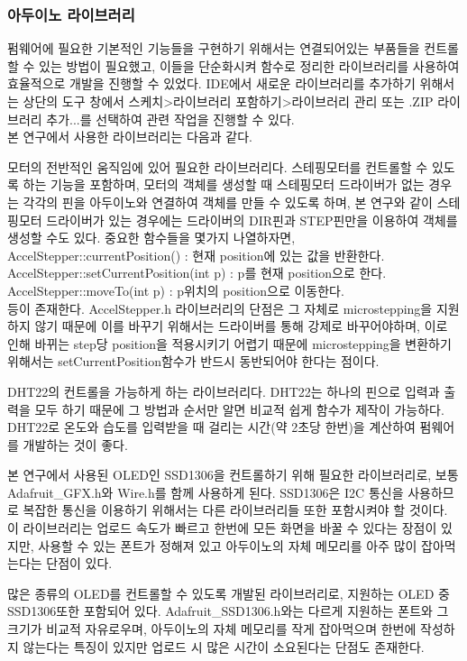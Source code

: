 \subsubsection{아두이노 라이브러리}
펌웨어에 필요한 기본적인 기능들을 구현하기 위해서는 연결되어있는 부품들을 컨트롤할 수 있는 방법이 필요했고, 이들을 단순화시켜 함수로 정리한 라이브러리를 사용하여 효율적으로 개발을 진행할 수 있었다.
IDE에서 새로운 라이브러리를 추가하기 위해서는 상단의 도구 창에서 스케치>라이브러리 포함하기>라이브러리 관리 또는 .ZIP 라이브러리 추가...를 선택하여 관련 작업을 진행할 수 있다.\\
본 연구에서 사용한 라이브러리는 다음과 같다.
\begin{description}[font=$\bullet$~\normalfont\scshape\color{red!50!black}]
	\item [AccelStepper.h] 모터의 전반적인 움직임에 있어 필요한 라이브러리다. 스테핑모터를 컨트롤할 수 있도록 하는 기능을 포함하며, 모터의 객체를 생성할 때 스테핑모터 드라이버가 없는 경우는 각각의 핀을 아두이노와 연결하여 객체를 만들 수 있도록 하며, 본 연구와 같이 스테핑모터 드라이버가 있는 경우에는 드라이버의 DIR핀과 STEP핀만을 이용하여 객체를 생성할 수도 있다. 중요한 함수들을 몇가지 나열하자면, \\
	
	
	AccelStepper::currentPosition() : 현재 position에 있는 값을 반환한다.\\
	AccelStepper::setCurrentPosition(int p) : p를 현재 position으로 한다.\\
	AccelStepper::moveTo(int p) : p위치의 position으로 이동한다.\\
	
	
	등이 존재한다. AccelStepper.h 라이브러리의 단점은 그 자체로 microstepping을 지원하지 않기 때문에 이를 바꾸기 위해서는 드라이버를 통해 강제로 바꾸어야하며, 이로 인해 바뀌는 step당 position을 적용시키기 어렵기 때문에 microstepping을 변환하기 위해서는 setCurrentPosition함수가 반드시 동반되어야 한다는 점이다.
	
	\item [DHT.h] DHT22의 컨트롤을 가능하게 하는 라이브러리다. DHT22는 하나의 핀으로 입력과 출력을 모두 하기 때문에 그 방법과 순서만 알면 비교적 쉽게 함수가 제작이 가능하다. DHT22로 온도와 습도를 입력받을 때 걸리는 시간(약 2초당 한번)을 계산하여 펌웨어를 개발하는 것이 좋다.
	
	\item [Adafruit\_SSD1306.h] 본 연구에서 사용된 OLED인 SSD1306을 컨트롤하기 위해 필요한 라이브러리로, 보통 Adafruit\_GFX.h와 Wire.h를 함께 사용하게 된다. SSD1306은 I2C 통신을 사용하므로 복잡한 통신을 이용하기 위해서는 다른 라이브러리들 또한 포함시켜야 할 것이다. 이 라이브러리는 업로드 속도가 빠르고 한번에 모든 화면을 바꿀 수 있다는 장점이 있지만, 사용할 수 있는 폰트가 정해져 있고 아두이노의 자체 메모리를 아주 많이 잡아먹는다는 단점이 있다.
	
	\item [U8glib.h] 많은 종류의 OLED를 컨트롤할 수 있도록 개발된 라이브러리로, 지원하는 OLED 중 SSD1306또한 포함되어 있다. Adafruit\_SSD1306.h와는 다르게 지원하는 폰트와 그 크기가 비교적 자유로우며, 아두이노의 자체 메모리를 작게 잡아먹으며 한번에 작성하지 않는다는 특징이 있지만 업로드 시 많은 시간이 소요된다는 단점도 존재한다.
\end{description}

